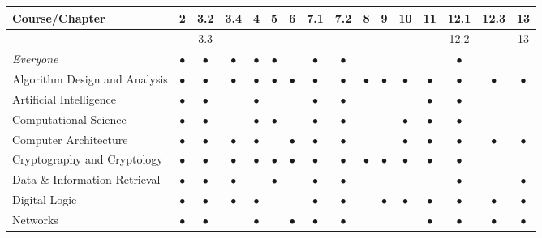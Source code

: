 
\noindent
\begin{tabular}{|l||c|c|c|c|c|c|c|c|c|c|c|c|c|c|c|}
\hline
{\bf Course}/{\bf Chapter}
   & 2 & 3.2 & 3.4 & 4 & 5 & 6 & 7.1 & 7.2 & 8 & 9 & 10 & 11 & 12.1 & 12.3 & 13 \\
   \hline

   &  & 3.3 &  &  &  &  &  &  &  &  &  &  & 12.2 &  & 13 \\
\hline
\hline
{\em Everyone} 
   & $\bullet$ & $\bullet$ & $\bullet$ & $\bullet$ & $\bullet$ &  & $\bullet$ & $\bullet$ &  &  &  &  & $\bullet$ & &  \\
\hline
Algorithm Design and Analysis
   & $\bullet$ & $\bullet$ & $\bullet$ & $\bullet$ & $\bullet$ & $\bullet$ & $\bullet$ & $\bullet$ & $\bullet$ & $\bullet$ & $\bullet$ & $\bullet$ & $\bullet$ & $\bullet$ & $\bullet$ \\
   \hline
Artificial Intelligence
   & $\bullet$ & $\bullet$ & & $\bullet$ &  &  & $\bullet$ & $\bullet$ &  &  &  & $\bullet$ & $\bullet$ & &  \\
   \hline
Computational Science
   & $\bullet$ & $\bullet$ & & $\bullet$ & $\bullet$ &  & $\bullet$ & $\bullet$ &  &  & $\bullet$ & $\bullet$ & $\bullet$ &  &  \\
\hline
Computer Architecture 
   & $\bullet$ & $\bullet$ & $\bullet$ & $\bullet$ &  & $\bullet$ & $\bullet$ & $\bullet$ &  &  & $\bullet$ & $\bullet$ & $\bullet$ & $\bullet$ & $\bullet$ \\
\hline
Cryptography and Cryptology 
   & $\bullet$ & $\bullet$ & $\bullet$ & $\bullet$ & $\bullet$ & $\bullet$ & $\bullet$ & $\bullet$ & $\bullet$ & $\bullet$ & $\bullet$ & $\bullet$ & $\bullet$ & &  \\
\hline
Data \& Information Retrieval
   & $\bullet$ & $\bullet$ & $\bullet$ & & $\bullet$ &  & $\bullet$ & $\bullet$ &  &  &  &  & $\bullet$ & & $\bullet$ \\
\hline
Digital Logic 
   & $\bullet$ & $\bullet$ & $\bullet$ & $\bullet$ &  &  & $\bullet$ & $\bullet$ &  & $\bullet$ & $\bullet$ & $\bullet$ & $\bullet$ & $\bullet$ & $\bullet$ \\
\hline
Networks
   & $\bullet$ & $\bullet$ & & $\bullet$ &  & $\bullet$ & $\bullet$ & $\bullet$ &  &  &  & $\bullet$ & $\bullet$ & $\bullet$ & $\bullet$ \\

\end{tabular}
